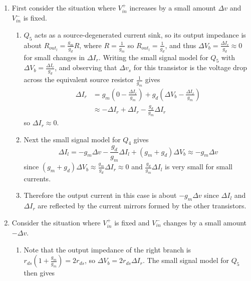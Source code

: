 \documentclass{article}
\begin{document}
\begin{enumerate}
  \item{First consider the situation where $V_{in}^{+}$ increases by a small amount
        $\Delta v$ and $V_{in}^{-}$ is fixed. 
    \begin{enumerate}
      \item{
        $Q_5$ acts as a 
        source-degenerated current sink, so its output impedance is about 
        $R_{out_l} = \frac{g_m}{g_d} R$, where $R = \frac{1}{g_m}$ so 
        $R_{out_l} = \frac{1}{g_d}$, and thus 
        $\Delta V_b = \frac{\Delta I_r}{g_d} \approx 0$ for small changes in 
        $\Delta I_r$. Writing the small signal model for $Q_5$ with 
        $\Delta V_b = \frac{\Delta I_r}{g_d}$, and observing that 
        $\Delta v_s$ for this transistor is the voltage drop across the
        equivalent source resistor $\frac{1}{g_m}$ gives
        \begin{align*}
          \Delta I_r &= g_m(0 - \frac{\Delta I_r}{g_m})
                     + g_d(\Delta V_b - \frac{\Delta I_r}{g_m}) \\
            &\approx -\Delta I_r + \Delta I_r - \frac{g_d}{g_m} \Delta I_r
        \end{align*}
        so $\Delta I_r \approx 0$.
      }
      \item{
        Next the small signal model for $Q_4$ gives
        $$
        \Delta I_l = -g_m \Delta v 
                     -\frac{g_d}{g_m} \Delta I_l 
                     +(g_m + g_d) \Delta V_b
             \approx -g_m \Delta v
        $$
        since $(g_m + g_d)\Delta V_b \approx 
               \frac{g_m}{g_d} \Delta I_r 
               \approx 0$
        and $\frac{g_d}{g_m} \Delta I_l$ is very small for small currents.
      }
      \item{
        Therefore the output current in this case is about $-g_m \Delta v$
        since $\Delta I_l$ and $\Delta I_r$ are reflected by the current 
        mirrors formed by the other transistors.
      }
    \end{enumerate}
   }
  \item{
    Consider the situation where $V_{in}^{+}$ is fixed and
    $V_{in}^{-}$ changes by a small amount $-\Delta v$. 
    \begin{enumerate}
      \item{
        Note that the output impedance of the right branch is 
        $r_{ds}(1 + \frac{g_m}{g_m}) = 2 r_{ds}$, so 
        $\Delta V_b = 2 r_{ds} \Delta I_r$. The small signal
        model for $Q_5$ then gives
}
\end{enumerate}}
\end{enumerate}
\end{document}
